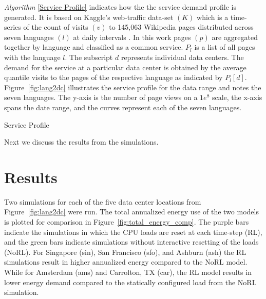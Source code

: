 \textit{Algorithm} \ref{Service Profile} indicates how the the service demand profile is generated. It is based on Kaggle's web-traffic data-set $(K)$ which is a time-series of the count of visits $(v)$ to 145,063 Wikipedia pages distributed across seven languages $(l)$ at daily intervals \citep{kaggle17}. In this work  pages $(p)$ are aggregated together by language and classified as a common service. $P_l$ is a list of all pages with the language $l$. The subscript $d$ represents individual data centers.  The demand for the service at a particular data center is obtained by the average quantile visits to the pages of the respective language as indicated by $P_{l}[d]$.  Figure~\ref{fig:lang2dc} illustrates the service profile for the data range and notes the seven languages. The y-axis is the number of page views on a $1e^8$ scale, the x-axis spans the date range, and the curves represent each of the seven languages.

\begin{algorithm}
\caption{Service Profile}
\begin{algorithmic}[1]
	\ENDFOR
	\ENDFOR
\end{algorithmic}
\label{Service Profile}
\end{algorithm}

Next we discuss the results from the simulations. 

\section*{Results}

Two simulations for each of the five data center locations from Figure~\ref{fig:lang2dc} were run. The total annualized energy use of the two models is plotted for comparison in Figure~\ref{fig:total_energy_comp}. The purple bars indicate the simulations in which the CPU loads are reset at each time-step (RL), and the green bars indicate simulations without interactive resetting of the loads (NoRL). For Singapore (sin), San Francisco (sfo), and Ashburn (ash) the RL simulations result in higher annualized energy compared to the NoRL model. While for Amsterdam (ams) and Carrolton, TX (car), the RL model results in lower energy demand compared to the statically configured load from the NoRL simulation.

